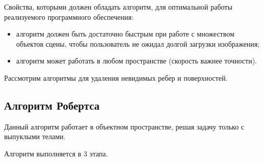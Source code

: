 \documentclass[a4paper,14pt, unknownkeysallowed]{extreport}
\begin{document}
Свойства, которыми должен обладать алгоритм, для оптимальной работы реализуемого программного обеспечения:

\begin{itemize}
	\item алгоритм должен быть достаточно быстрым при работе с множеством объектов сцены, чтобы пользователь не ожидал долгой загрузки изображения;
	\item алгоритм может работать в любом пространстве (скорость важнее точности).
\end{itemize}

Рассмотрим алгоритмы для удаления невидимых ребер и поверхностей.

\subsection{Алгоритм Робертса}

Данный алгоритм работает в объектном пространстве, решая задачу только с выпуклыми телами.

Алгоритм выполняется в 3 этапа.
\end{document}
